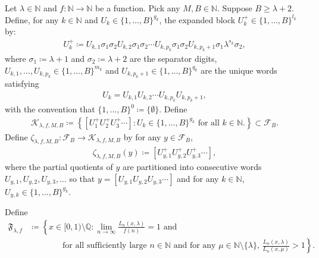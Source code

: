 \documentclass[12pt,reqno]{amsart}
\theoremstyle{definition}
\theoremstyle{plain}
\begin{document}
Let $\lambda\in\mathbb{N}$ and $f:\mathbb{N}\to\mathbb{N}$ be a function. Pick any $M,B\in\mathbb{N}$. Suppose $B\geq\lambda+2$.
Define, for any $k\in\mathbb N$ and $U_k\in\{1,\dots,B\}^{g_k}$, the expanded block $U^+_k\in\{1,\dots,B\}^{l_k}$ by:
\begin{align*}
    U^+_k
    \coloneqq
    U_{k,1}\sigma_1\sigma_2U_{k,2}\sigma_1\sigma_2\cdots U_{k,p_k}\sigma_1\sigma_2U_{k,p_k+1}\sigma_1\lambda^{s_k}\sigma_2,
\end{align*}
where $\sigma_1\coloneqq \lambda+1$ and $\sigma_2\coloneqq \lambda+2$ are the separator digits, $U_{k,1},\dots,U_{k,p_k}\in \{1,\dots,B\}^{m_k}$ and $U_{k,p_k+1}\in \{1,\dots,B\}^{q_k}$ are the unique words satisfying 
\begin{align*}
    U_k=U_{k,1}U_{k,2}\cdots U_{k,p_k}U_{k,p_k+1},
\end{align*}
with the convention that $\{1,\ldots,B\}^0\coloneqq \{\emptyset\}$. Define
\begin{align*}
    \mathcal{K}_{\lambda,f,M,B}
    \coloneqq\left\{\left[U^+_1U^+_2U^+_3\cdots\right]:
    U_k\in\{1,\dots,B\}^{g_k}\text{ for all $k\in\mathbb{N}$.}\right\}
    \subset\mathcal{F}_B.
\end{align*}
Define $\zeta_{\lambda,f,M,B}:\mathcal{F}_B\to\mathcal{K}_{\lambda,f,M,B}$ by for any $y\in \mathcal{F}_B$,
\begin{align*}
    \zeta_{\lambda,f,M,B}(y)
    \coloneqq\left[U^+_{y,1}U^+_{y,2}U^+_{y,3}\cdots\right],
\end{align*}
where the partial quotients of $y$ are partitioned into consecutive words $U_{y,1},U_{y,2},U_{y,3},\ldots$ so that $y=[U_{y,1}U_{y,2}U_{y,3}\cdots]$ and for any $k\in\mathbb{N}$, $U_{y,k}\in\{1,\dots,B\}^{g_k}$. 

Define
\begin{align*}
    \mathfrak{F}_{\lambda,f}
    &\coloneqq
    \left\{x\in[0,1)\setminus\mathbb{Q}:
    \lim_{n\to\infty}\frac{L_n(x,\lambda)}{f(n)}=1
    \text{ and }\right.\\
    &\qquad\qquad\left.\text{for all sufficiently large $n\in\mathbb{N}$ and for any $\mu\in\mathbb{N}\setminus\{\lambda\}$, }\frac{L_n(x,\lambda)}{L_n(x,\mu)}>1\right\}.
\end{align*}
\end{document}

